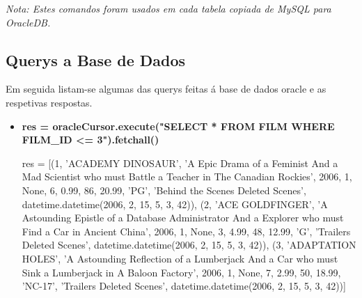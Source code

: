 \textit{Nota: Estes comandos foram usados em cada tabela copiada de MySQL para OracleDB.}

\subsection{Querys a Base de Dados}

Em seguida listam-se algumas das querys feitas á base de dados oracle e as respetivas respostas.

\begin{itemize}
\item \textbf{res = oracleCursor.execute("SELECT * FROM FILM WHERE FILM\_ID <= 3").fetchall()}

res = [(1, 'ACADEMY DINOSAUR', 'A Epic Drama of a Feminist And a Mad Scientist who must Battle a Teacher in The Canadian Rockies', 2006, 1, None, 6, 0.99, 86, 20.99, 'PG', 'Behind the Scenes Deleted Scenes', datetime.datetime(2006, 2, 15, 5, 3, 42)), (2, 'ACE GOLDFINGER', 'A Astounding Epistle of a Database Administrator And a Explorer who must Find a Car in Ancient China', 2006, 1, None, 3, 4.99, 48, 12.99, 'G', 'Trailers Deleted Scenes', datetime.datetime(2006, 2, 15, 5, 3, 42)), (3, 'ADAPTATION HOLES', 'A Astounding Reflection of a Lumberjack And a Car who must Sink a Lumberjack in A Baloon Factory', 2006, 1, None, 7, 2.99, 50, 18.99, 'NC-17', 'Trailers Deleted Scenes', datetime.datetime(2006, 2, 15, 5, 3, 42))]

\end{itemize}











